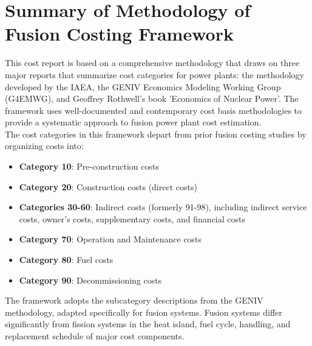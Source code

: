 \section{Summary of Methodology of Fusion Costing Framework}

This cost report is based on a comprehensive methodology that draws on three major reports that summarize cost categories for power plants: the methodology developed by the IAEA, the GENIV Economics Modeling Working Group (G4EMWG), and Geoffrey Rothwell's book 'Economics of Nuclear Power'. The framework uses well-documented and contemporary cost basis methodologies to provide a systematic approach to fusion power plant cost estimation.\\

The cost categories in this framework depart from prior fusion costing studies by organizing costs into:
\begin{itemize}
    \item \textbf{Category 10}: Pre-construction costs
    \item \textbf{Category 20}: Construction costs (direct costs)
    \item \textbf{Categories 30-60}: Indirect costs (formerly 91-98), including indirect service costs, owner's costs, supplementary costs, and financial costs
    \item \textbf{Category 70}: Operation and Maintenance costs
    \item \textbf{Category 80}: Fuel costs
    \item \textbf{Category 90}: Decommissioning costs
\end{itemize}

The framework adopts the subcategory descriptions from the GENIV methodology, adapted specifically for fusion systems. Fusion systems differ significantly from fission systems in the heat island, fuel cycle, handling, and replacement schedule of major cost components.\\

